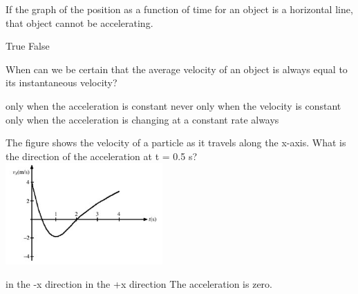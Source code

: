 \documentclass[11pt]{exam}
\begin{document}
\begin{questions}

\question
\iftoggle{hideans}{\underline{~~~~~~~~~~~}}{\underline{~~~~~A~~~~~}}
If the graph of the position as a function of time for an object is a horizontal line, that object cannot be accelerating.
\begin{choices}
   \choice True
   \choice False
\end{choices}



\question
\iftoggle{hideans}{\underline{~~~~~~~~~~~}}{\underline{~~~~~C~~~~~}}
When can we be certain that the average velocity of an object is always equal to its instantaneous velocity?
\begin{choices}
   \choice only when the acceleration is constant
   \choice never
   \choice only when the velocity is constant
   \choice only when the acceleration is changing at a constant rate
   \choice always
\end{choices}


\question
\iftoggle{hideans}{\underline{~~~~~~~~~~~}}{\underline{~~~~~A~~~~~}}
The figure shows the velocity of a particle as it travels along the x-axis. What is the direction of the acceleration at t = 0.5 s?\\
\includegraphics[width=0.45\textwidth]{figures/2_15.jpg}
\begin{choices}
   \choice in the -x direction
   \choice in the +x direction
   \choice The acceleration is zero.
\end{choices}


\end{questions}
\end{document}

